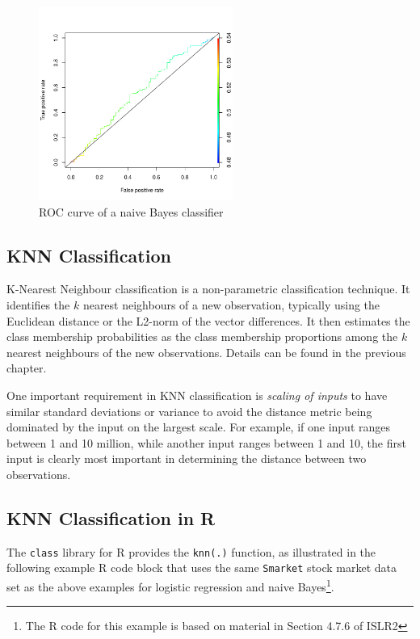 \begin{figure}
\centering
\includegraphics[height=2.5in]{nb_roc.pdf}
\caption{ROC curve of a naive Bayes classifier}
\label{fig:naiveBayesROC}
\end{figure}

\subsection{KNN Classification}

K-Nearest Neighbour classification is a non-parametric classification technique. It identifies the $k$ nearest neighbours of a new observation, typically using the Euclidean distance or the L2-norm of the vector differences. It then estimates the class membership probabilities as the class membership proportions among the $k$ nearest neighbours of the new observations. Details can be found in the previous chapter. 

One important requirement in KNN classification is \emph{scaling of inputs} to have similar standard deviations or variance to avoid the distance metric being dominated by the input on the largest scale. For example, if one input ranges between 1 and 10 million, while another input ranges between 1 and 10, the first input is clearly most important in determining the distance between two observations.

\subsection{KNN Classification in R}

The \texttt{class} library for R provides the \texttt{knn(.)} function, as illustrated in the following example R code block that uses the same \texttt{Smarket} stock market data set as the above examples for logistic regression and naive Bayes\footnote{The R code for this example is based on material in Section 4.7.6 of ISLR2}.

